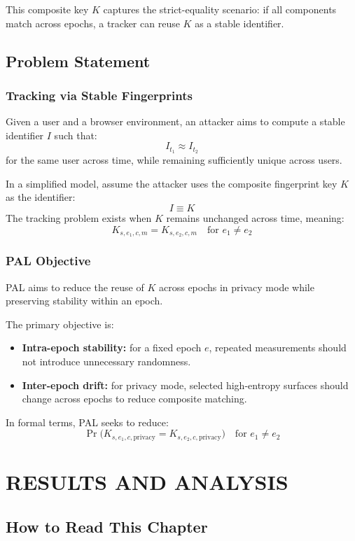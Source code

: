\documentclass[11pt]{report}
\begin{document}
This composite key $K$ captures the strict-equality scenario: if all components match across epochs, a tracker can reuse $K$ as a stable identifier.

\section{Problem Statement}

\subsection{Tracking via Stable Fingerprints}

Given a user and a browser environment, an attacker aims to compute a stable identifier $I$ such that:
\[
I_{t_1} \approx I_{t_2}
\]
for the same user across time, while remaining sufficiently unique across users.

In a simplified model, assume the attacker uses the composite fingerprint key $K$ as the identifier:
\[
I \equiv K
\]
The tracking problem exists when $K$ remains unchanged across time, meaning:
\[
K_{s,e_1,c,m} = K_{s,e_2,c,m} \quad \text{for } e_1 \ne e_2
\]

\subsection{PAL Objective}

PAL aims to reduce the reuse of $K$ across epochs in privacy mode while preserving stability within an epoch.

The primary objective is:

\begin{itemize}
    \item \textbf{Intra-epoch stability:} for a fixed epoch $e$, repeated measurements should not introduce unnecessary randomness.
    \item \textbf{Inter-epoch drift:} for privacy mode, selected high-entropy surfaces should change across epochs to reduce composite matching.
\end{itemize}

In formal terms, PAL seeks to reduce:
\[
\Pr\Big(K_{s,e_1,c,\text{privacy}} = K_{s,e_2,c,\text{privacy}}\Big)
\quad \text{for } e_1 \ne e_2
\]

\chapter{RESULTS AND ANALYSIS}

\section{How to Read This Chapter}
\end{document}
